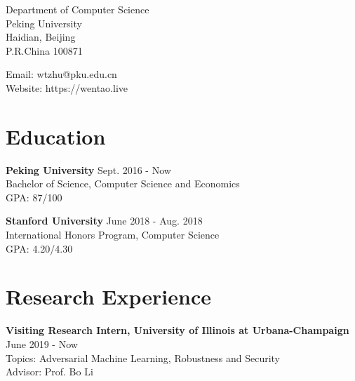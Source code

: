 \documentclass{academiccv}
\begin{document}
\raggedright


\vspace{1em}
\begin{minipage}[t]{0.495\textwidth}
  Department of Computer Science \\
 Peking University\\
  Haidian, Beijing\\
  P.R.China 100871
\end{minipage}
\begin{minipage}[t]{0.495\textwidth}
  Email: wtzhu@pku.edu.cn \\
  Website: https://wentao.live \\
\end{minipage}
\vspace{0.5em}


\section*{Education}



\textbf{Peking University} \hfill Sept. 2016 - Now  \\
Bachelor of Science, Computer Science and Economics \\
GPA: 87/100 \newline

\textbf{Stanford University} \hfill June 2018 - Aug. 2018 \\
International Honors Program, Computer Science \\
GPA: 4.20/4.30 \\

\section*{Research Experience}

\textbf{Visiting Research Intern, University of Illinois at Urbana-Champaign} \hfill June 2019 - Now  \\
Topics: Adversarial Machine Learning, Robustness and Security \\
Advisor: Prof. Bo Li \newline
\end{document}
